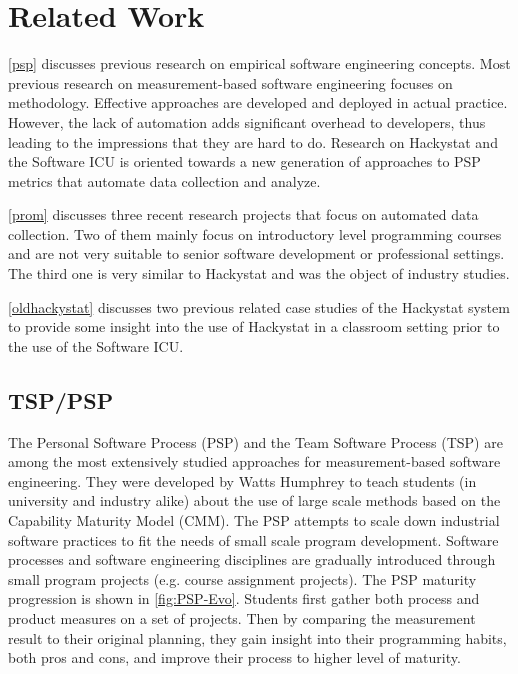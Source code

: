 \chapter{Related Work}

\autoref{psp} discusses previous research on empirical software engineering concepts. Most previous research on measurement-based software engineering focuses on methodology. Effective approaches are developed and deployed in actual practice. However, the lack of automation adds significant overhead to developers, thus leading to the impressions that they are hard to do. Research on Hackystat and the Software ICU is oriented towards a new generation of approaches to PSP metrics that automate data collection and analyze\cite{csdl2-02-07}.

\autoref{prom} discusses three recent research projects that focus on automated data collection. Two of them mainly focus on introductory level programming courses and are not very suitable to senior software development or professional settings. The third one is very similar to Hackystat and was the object of industry studies.


\autoref{oldhackystat} discusses two previous related case studies of the Hackystat system to provide some insight into the use of Hackystat in a classroom setting prior to the use of the Software ICU.

\section {TSP/PSP}
\label{psp}
The Personal Software Process (PSP)\cite{book:psp} and the Team Software Process (TSP)\cite{book:tsp} are among the most extensively studied approaches for measurement-based software engineering. They were developed by Watts Humphrey to teach students (in university and industry alike) about the use of large scale methods based on the Capability Maturity Model (CMM)\cite{cmm}. The PSP attempts to scale down industrial software practices to fit the needs of small scale program development. Software processes and software engineering disciplines are gradually introduced through small program projects (e.g. course assignment projects). The PSP maturity progression is shown in \autoref{fig:PSP-Evo}. Students first gather both process and product measures on a set of projects. Then by comparing the measurement result to their original planning, they gain insight into their programming habits, both pros and cons, and improve their process to higher level of maturity.

